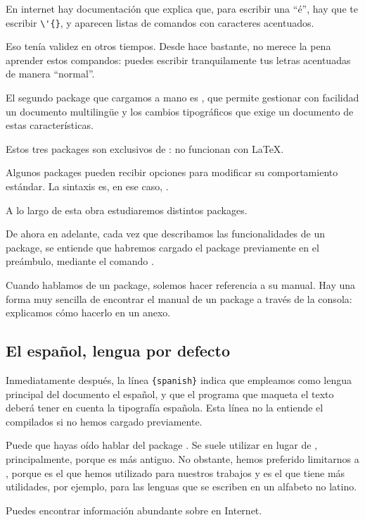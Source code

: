 \begin{plusloins}
En internet hay documentación que explica que, para escribir una \enquote{é}, hay que te escribir \verb|\'{}|, y aparecen listas de comandos con caracteres acentuados.

Eso tenía validez en otros tiempos. Desde hace bastante, no merece la pena aprender estos compandos: puedes escribir tranquilamente tus letras acentuadas de manera \enquote{normal}. 
\end{plusloins}

El segundo package que cargamos a mano es , que permite gestionar con facilidad un documento multilingüe y los cambios tipográficos que exige un documento de estas características.

Estos tres packages son exclusivos de \XeLaTeX{}: no funcionan con \LaTeX.

Algunos packages pueden recibir opciones para modificar su comportamiento estándar. La sintaxis es, en ese caso, .

A lo largo de esta obra estudiaremos distintos packages.

\begin{attention}
De ahora en adelante, cada vez que describamos las funcionalidades de un package, se entiende que habremos cargado el package previamente en el preámbulo, mediante el comando .
\end{attention}

\begin{plusloins}
Cuando hablamos de un package, solemos hacer referencia a su manual. Hay una forma muy sencilla de encontrar el manual de un package a través de la consola: explicamos cómo hacerlo en un anexo.
\end{plusloins}

\subsection{El español, lengua por defecto\label{french}}

Inmediatamente después, la línea \verb|{spanish}| indica que empleamos como lengua principal del documento el español, y que el programa que maqueta el texto deberá tener en cuenta la tipografía española. Esta línea no la entiende el compilados si no hemos cargado previamente.

\begin{plusloins}
Puede que hayas oído hablar del package . Se suele utilizar en lugar de , principalmente, porque es más antiguo. No obstante, hemos preferido limitarnos a , porque es el que hemos utilizado para nuestros trabajos y es el que tiene más utilidades, por ejemplo, para las lenguas que se escriben en un alfabeto no latino.

Puedes encontrar información abundante sobre  en Internet.

\end{plusloins}

